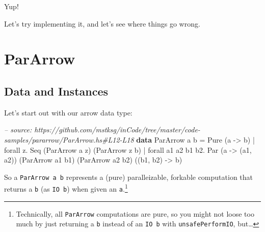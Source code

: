 \documentclass[]{article}
\newenvironment{Shaded}{\begin{snugshade}}{\end{snugshade}}
\newcommand{\CommentTok}[1]{\textcolor[rgb]{0.56,0.35,0.01}{\textit{#1}}}
\newcommand{\DataTypeTok}[1]{\textcolor[rgb]{0.13,0.29,0.53}{#1}}
\newcommand{\FunctionTok}[1]{\textcolor[rgb]{0.00,0.00,0.00}{#1}}
\newcommand{\KeywordTok}[1]{\textcolor[rgb]{0.13,0.29,0.53}{\textbf{#1}}}
\newcommand{\NormalTok}[1]{#1}
\newcommand{\OtherTok}[1]{\textcolor[rgb]{0.56,0.35,0.01}{#1}}
\begin{document}
Yup!

Let's try implementing it, and let's see where things go wrong.

\hypertarget{pararrow}{%
\section{ParArrow}\label{pararrow}}

\hypertarget{data-and-instances}{%
\subsection{Data and Instances}\label{data-and-instances}}

Let's start out with our arrow data type:

\begin{Shaded}
\begin{Highlighting}[]
\CommentTok{-- source: https://github.com/mstksg/inCode/tree/master/code-samples/pararrow/ParArrow.hs#L12-L18}
\KeywordTok{data} \DataTypeTok{ParArrow}\NormalTok{ a b }\FunctionTok{=}                     \DataTypeTok{Pure}\NormalTok{  (a }\OtherTok{->}\NormalTok{ b)}
                  \FunctionTok{|}\NormalTok{ forall z}\FunctionTok{.}           \DataTypeTok{Seq}\NormalTok{   (}\DataTypeTok{ParArrow}\NormalTok{ a z)}
\NormalTok{                                              (}\DataTypeTok{ParArrow}\NormalTok{ z b)}
                  \FunctionTok{|}\NormalTok{ forall a1 a2 b1 b2}\FunctionTok{.} \DataTypeTok{Par}\NormalTok{   (a }\OtherTok{->}\NormalTok{ (a1, a2))}
\NormalTok{                                              (}\DataTypeTok{ParArrow}\NormalTok{ a1 b1)}
\NormalTok{                                              (}\DataTypeTok{ParArrow}\NormalTok{ a2 b2)}
\NormalTok{                                              ((b1, b2) }\OtherTok{->}\NormalTok{ b)}
\end{Highlighting}
\end{Shaded}

So a \texttt{ParArrow\ a\ b} represents a (pure) paralleizable, forkable
computation that returns a \texttt{b} (as \texttt{IO\ b}) when given an
\texttt{a}.\footnote{Technically, all \texttt{ParArrow} computations are pure,
  so you might not loose too much by just returning a \texttt{b} instead of an
  \texttt{IO\ b} with \texttt{unsafePerformIO}, but\ldots{}}
\end{document}
